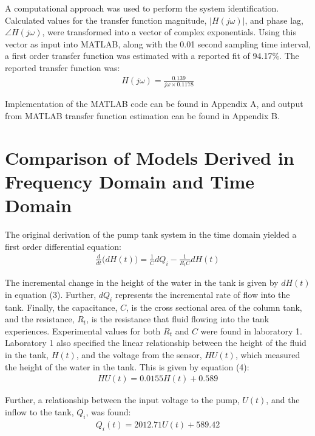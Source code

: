 \documentclass{article}
\begin{document}
A computational approach was used to perform the system identification. Calculated values for the transfer function magnitude, $|H(j\omega)|$, and phase lag, $\angle H(j\omega)$, were transformed into a vector of complex exponentials. Using this vector as input into MATLAB, along with the 0.01 second sampling time interval, a first order transfer function was estimated with a reported fit of 94.17\%. The reported transfer function was:
\begin{align}
	H(j\omega) = \frac{0.139}{j\omega \times 0.1178}
\end{align}

Implementation of the MATLAB code can be found in Appendix A, and output from MATLAB transfer function estimation can be found in Appendix B.

\section{Comparison of Models Derived in Frequency Domain and Time Domain}

The original derivation of the pump tank system in the time domain yielded a first order differential equation:
\begin{align}
	\frac{d}{dt}\big(dH(t)\big) = \frac{1}{C}dQ_i - \frac{1}{R_tC}dH(t)
\end{align}

The incremental change in the height of the water in the tank is given by $dH(t)$ in equation (3). Further, $dQ_i$ represents the incremental rate of flow into the tank. Finally, the capacitance, $C$, is the cross sectional area of the column tank, and the resistance, $R_t$, is the resistance that fluid flowing into the tank experiences. Experimental values for both $R_t$ and $C$ were found in laboratory 1. Laboratory 1 also specified the linear relationship between the height of the fluid in the tank, $H(t)$, and the voltage from the sensor, $HU(t)$, which measured the height of the water in the tank. This is given by equation (4):
\begin{align}
	HU(t) = 0.0155H(t) + 0.589
\end{align}

Further, a relationship between the input voltage to the pump, $U(t)$, and the inflow to the tank, $Q_i$, was found:
\begin{align}
	Q_i(t) = 2012.71U(t) + 589.42
\end{align}
\end{document}
